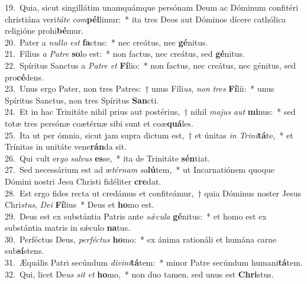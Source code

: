 {19.~}Quia, sicut singillátim unamquámque persónam Deum ac Dóminum confitéri christiána veri\textit{tá}\textit{te} \textit{com}\textbf{pél}limur:~* ita tres Deos aut Dóminos dícere cathólica religióne prohi\textbf{bé}mur.\\
{20.~}Pater a \textit{nul}\textit{lo} \textit{est} \textbf{fa}ctus:~* nec creátus, nec \textbf{gé}nitus.\\
{21.~}Fílius \textit{a} \textit{Pa}\textit{tre} \textbf{so}lo est:~* non factus, nec creátus, sed \textbf{gé}nitus.\\
{22.~}Spíritus Sanctus a \textit{Pa}\textit{tre} \textit{et} \textbf{Fí}lio:~* non factus, nec creátus, nec génitus, sed pro\textbf{cé}dens.\\
{23.~}Unus ergo Pater, non tres Patres:~† unus Fíli\textit{us}, \textit{non} \textit{tres} \textbf{Fí}lii:~* unus Spíritus Sanctus, non tres Spíritus \textbf{San}cti.\\
{24.~}Et in hac Trinitáte nihil prius aut postérius,~† nihil \textit{ma}\textit{jus} \textit{aut} \textbf{mi}nus:~* sed totæ tres persónæ coætérnæ sibi sunt et coæ\textbf{quá}les.\\
{25.~}Ita ut per ómnia, sicut jam supra dictum est,~† et únitas \textit{in} \textit{Tri}\textit{ni}\textbf{tá}te,~* et Trínitas in unitáte vene\textbf{rán}da sit.\\
{26.~}Qui vult er\textit{go} \textit{sal}\textit{vus} \textbf{es}se,~* ita de Trinitáte \textbf{sén}tiat.\\
{27.~}Sed necessárium est ad æ\textit{tér}\textit{nam} \textit{sa}\textbf{lú}tem,~* ut Incarnatiónem quoque Dómini nostri Jesu Christi fidéliter \textbf{cre}dat.\\
{28.~}Est ergo fides recta ut credámus et confiteámur,~† quia Dóminus noster Jesus Chri\textit{stus}, \textit{De}\textit{i} \textbf{Fí}lius~* Deus et \textbf{ho}mo est.\\
{29.~}Deus est ex substántia Patris ante \textit{sǽ}\textit{cu}\textit{la} \textbf{gé}nitus:~* et homo est ex substántia matris in sǽculo \textbf{na}tus.\\
{30.~}Perféctus Deus, \textit{per}\textit{fé}\textit{ctus} \textbf{ho}mo:~* ex ánima rationáli et humána carne sub\textbf{sí}stens.\\
{31.~}Æquális Patri secúndum \textit{di}\textit{vi}\textit{ni}\textbf{tá}tem:~* minor Patre secúndum humani\textbf{tá}tem.\\
{32.~}Qui, licet De\textit{us} \textit{sit} \textit{et} \textbf{ho}mo,~* non duo tamen, sed unus est \textbf{Chri}stus.\\
